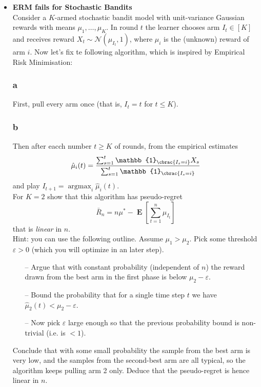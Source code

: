 \documentclass[10pt, a4paper, twoside]{amsart}
\theoremstyle{plain}
\DeclarePairedDelimiter\cbrac\{\}
\newcommand{\Ind}{\ensuremath{\mathbb{1}}}
\newcommand{\argmax}{\operatorname*{argmax}}
\newcommand{\Ev}{\operatorname*{\ensuremath{\mathbf{E}}}} %
\begin{document}
\begin{itemize}
    \item \textbf{ERM fails for Stochastic Bandits} \\
    Consider a $K$-armed stochastic bandit model with unit-variance Gaussian rewards with means $\mu_1,\ldots ,\mu_K$. In round $t$ the learner chooses arm $I_t \in [K]$ and receives reward $X_t \sim \mathcal{N}(\mu_{I_t}, 1)$, where $\mu_i$ is the (unknown) reward of arm $i$. Now let's fix te following algorithm, which is inspired by Empirical Risk Minimisation:
    \subsubsection*{a} First, pull every arm once (that is, $I_t = t$ for $t \leq K$).
    \subsubsection*{b} Then after eacch number $t \geq K$ of rounds, from the empirical estimates
    \begin{equation*}
        \hat{\mu}_i(t) = \frac{\sum_{s=1}^t \Ind_{\cbrac{I_s = i}} X_s}{\sum_{s=1}^t \Ind_{\cbrac{I_s =i}}}
    \end{equation*}
    and play $I_{t+1} = \argmax_i \hat{\mu}_i(t)$.\\
    For $K = 2$ show that this algorithm has pseudo-regret
    \begin{equation*}
        \bar{R}_n = n\mu^* - \Ev \left[ \sum_{t=1}^n \mu_{I_t} \right]
    \end{equation*}
    that is \textit{linear} in $n$.\\
    Hint: you can use the following outline. Assume $\mu_1 > \mu_2$. Pick some threshold $\varepsilon >0$ (which you will optimize in an later step).
    \begin{itemize}
        \item[--] Argue that with constant probability (independent of $n$) the reward drawn from the best arm in the first phase is below $\mu_2 - \varepsilon$.
        \item[--] Bound the probability that for a single time step $t$ we have $\hat{\mu}_2(t) < \mu_2 - \varepsilon$.
        \item[--] Now pick $\varepsilon$ large enough so that the previous probability bound is non-trivial (i.e. is $<1$).
    \end{itemize}
    Conclude that with some small probability the sample from the best arm is very low, and the samples from the second-best arm are all typical, so the algorithm keeps pulling arm 2 only. Deduce that the pseudo-regret is hence linear in $n$.
\end{itemize}
\end{document}
